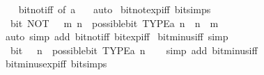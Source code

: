 \begin{isabellebody}
%
\isadelimproof
\ \ %
\endisadelimproof
%
\isatagproof
{}\isamarkupfalse%
\ bit{\isacharunderscore}{\kern0pt}not{\isacharunderscore}{\kern0pt}iff\ {\isacharbrackleft}{\kern0pt}of\ a\ {}{\isacharbrackright}{\kern0pt}\ \isamarkupfalse%
\ auto%
\endisatagproof
{\isafoldproof}%
%
\isadelimproof
\isanewline
%
\endisadelimproof
\isanewline
{}\isamarkupfalse%
\ bit{\isacharunderscore}{\kern0pt}not{\isacharunderscore}{\kern0pt}exp{\isacharunderscore}{\kern0pt}iff\ {\isacharbrackleft}{\kern0pt}bit{\isacharunderscore}{\kern0pt}simps{\isacharbrackright}{\kern0pt}{\isacharcolon}{\kern0pt}\isanewline
\ \ {\isacartoucheopen}bit\ {\isacharparenleft}{\kern0pt}NOT\ {\isacharparenleft}{\kern0pt}{}\ {\isacharcircum}{\kern0pt}\ m{\isacharparenright}{\kern0pt}{\isacharparenright}{\kern0pt}\ n\ {\isasymlongleftrightarrow}\ possible{\isacharunderscore}{\kern0pt}bit\ TYPE{\isacharparenleft}{\kern0pt}{\isacharprime}{\kern0pt}a{\isacharparenright}{\kern0pt}\ n\ {\isasymand}\ n\ {\isasymnoteq}\ m{\isacartoucheclose}\isanewline
%
\isadelimproof
\ \ %
\endisadelimproof
%
\isatagproof
{}\isamarkupfalse%
\ {\isacharparenleft}{\kern0pt}auto\ simp\ add{\isacharcolon}{\kern0pt}\ bit{\isacharunderscore}{\kern0pt}not{\isacharunderscore}{\kern0pt}iff\ bit{\isacharunderscore}{\kern0pt}exp{\isacharunderscore}{\kern0pt}iff{\isacharparenright}{\kern0pt}%
\endisatagproof
{\isafoldproof}%
%
\isadelimproof
\isanewline
%
\endisadelimproof
\isanewline
{}\isamarkupfalse%
\ bit{\isacharunderscore}{\kern0pt}minus{\isacharunderscore}{\kern0pt}{}{\isacharunderscore}{\kern0pt}iff\ {\isacharbrackleft}{\kern0pt}simp{\isacharbrackright}{\kern0pt}{\isacharcolon}{\kern0pt}\isanewline
\ \ {\isacartoucheopen}bit\ {\isacharparenleft}{\kern0pt}{\isacharminus}{\kern0pt}\ {}{\isacharparenright}{\kern0pt}\ n\ {\isasymlongleftrightarrow}\ possible{\isacharunderscore}{\kern0pt}bit\ TYPE{\isacharparenleft}{\kern0pt}{\isacharprime}{\kern0pt}a{\isacharparenright}{\kern0pt}\ n{\isacartoucheclose}\isanewline
%
\isadelimproof
\ \ %
\endisadelimproof
%
\isatagproof
{}\isamarkupfalse%
\ {\isacharparenleft}{\kern0pt}simp\ add{\isacharcolon}{\kern0pt}\ bit{\isacharunderscore}{\kern0pt}minus{\isacharunderscore}{\kern0pt}iff{\isacharparenright}{\kern0pt}%
\endisatagproof
{\isafoldproof}%
%
\isadelimproof
\isanewline
%
\endisadelimproof
\isanewline
{}\isamarkupfalse%
\ bit{\isacharunderscore}{\kern0pt}minus{\isacharunderscore}{\kern0pt}exp{\isacharunderscore}{\kern0pt}iff\ {\isacharbrackleft}{\kern0pt}bit{\isacharunderscore}{\kern0pt}simps{\isacharbrackright}{\kern0pt}{\isacharcolon}{\kern0pt}\isanewline

\end{isabellebody}
